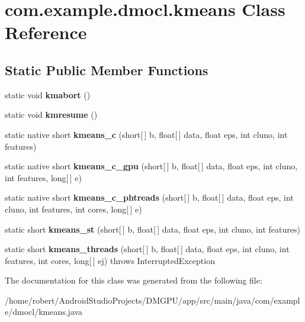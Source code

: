 \hypertarget{classcom_1_1example_1_1dmocl_1_1kmeans}{}\section{com.\+example.\+dmocl.\+kmeans Class Reference}
\label{classcom_1_1example_1_1dmocl_1_1kmeans}
\subsection*{Static Public Member Functions}
\begin{DoxyCompactItemize}
\item 
\mbox{\label{classcom_1_1example_1_1dmocl_1_1kmeans_a8a721ea7f32bd548c7e1bd51eb7d18eb}} 
static void {\bfseries kmabort} ()
\item 
\mbox{\label{classcom_1_1example_1_1dmocl_1_1kmeans_a5ba1945e6b7756886fd7a96babe493b7}} 
static void {\bfseries kmresume} ()
\item 
\mbox{\label{classcom_1_1example_1_1dmocl_1_1kmeans_a625b4b50289fb4b70df9f5e75d0171cc}} 
static native short {\bfseries kmeans\+\_\+c} (short\mbox{[}$\,$\mbox{]} b, float\mbox{[}$\,$\mbox{]} data, float eps, int cluno, int features)
\item 
\mbox{\label{classcom_1_1example_1_1dmocl_1_1kmeans_afc49721ef1764e59e83082eb30e913b0}} 
static native short {\bfseries kmeans\+\_\+c\+\_\+gpu} (short\mbox{[}$\,$\mbox{]} b, float\mbox{[}$\,$\mbox{]} data, float eps, int cluno, int features, long\mbox{[}$\,$\mbox{]} e)
\item 
\mbox{\label{classcom_1_1example_1_1dmocl_1_1kmeans_a87c0e078ffcfec39078fe9caf504af1e}} 
static native short {\bfseries kmeans\+\_\+c\+\_\+phtreads} (short\mbox{[}$\,$\mbox{]} b, float\mbox{[}$\,$\mbox{]} data, float eps, int cluno, int features, int cores, long\mbox{[}$\,$\mbox{]} e)
\item 
\mbox{\label{classcom_1_1example_1_1dmocl_1_1kmeans_a589995b7517109b01302666587ace215}} 
static short {\bfseries kmeans\+\_\+st} (short\mbox{[}$\,$\mbox{]} b, float\mbox{[}$\,$\mbox{]} data, float eps, int cluno, int features)
\item 
\mbox{\label{classcom_1_1example_1_1dmocl_1_1kmeans_a9d1125246428c8ec0569608c88f1c7b7}} 
static short {\bfseries kmeans\+\_\+threads} (short\mbox{[}$\,$\mbox{]} b, float\mbox{[}$\,$\mbox{]} data, float eps, int cluno, int features, int cores, long\mbox{[}$\,$\mbox{]} ej)  throws Interrupted\+Exception 
\end{DoxyCompactItemize}


The documentation for this class was generated from the following file\+:\begin{DoxyCompactItemize}
\item 
/home/robert/\+Android\+Studio\+Projects/\+D\+M\+G\+P\+U/app/src/main/java/com/example/dmocl/kmeans.\+java\end{DoxyCompactItemize}
